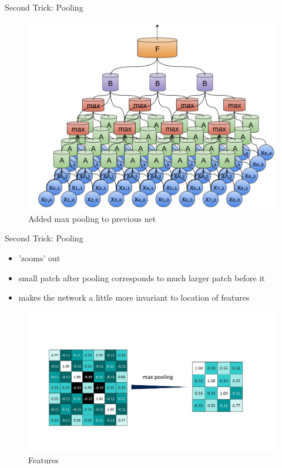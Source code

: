 \documentclass[12pt]{beamer}
\begin{document}
\begin{frame}{Second Trick: Pooling}
\begin{figure}
\includegraphics[width = 0.7\linewidth]{images/conv3.png}
\caption{Added max pooling to previous net}
\label{fig:principle}
\end{figure}

\end{frame}

\begin{frame}{Second Trick: Pooling}
  \begin{itemize}
  \item 'zooms' out
  \item small patch after pooling corresponds to much larger patch before it
   \item makes the network a little more invariant to location of features
    \end{itemize}
\begin{figure}
\includegraphics[width = 0.8\linewidth]{images/pooling.jpg}
\caption{Features}
\label{fig:principle}
\end{figure}

\end{frame}
\end{document}
